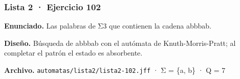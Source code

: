 
\hypertarget{lista-2-ejercicio-102}{%
\subsubsection{Lista 2 · Ejercicio 102}\label{lista-2-ejercicio-102}}

\textbf{Enunciado.} Las palabras de Σ3 que contienen la cadena abbbab.

\textbf{Diseño.} Búsqueda de abbbab con el autómata de Knuth-Morris-Pratt; al completar el patrón el estado es absorbente.

\textbf{Archivo.} \texttt{automatas/lista2/lista2-102.jff} · Σ = \{a, b\} · \textbar Q\textbar{} = 7

